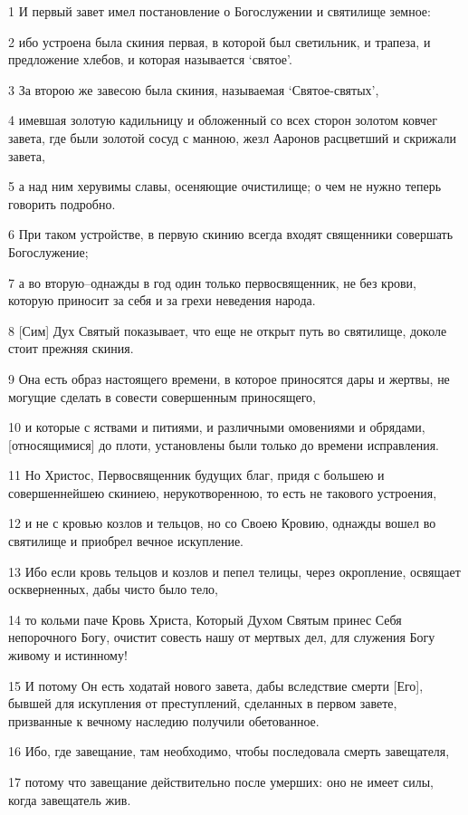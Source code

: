 \par 1 И первый завет имел постановление о Богослужении и святилище земное:
\par 2 ибо устроена была скиния первая, в которой был светильник, и трапеза, и предложение хлебов, и которая называется `святое'.
\par 3 За второю же завесою была скиния, называемая `Святое-святых',
\par 4 имевшая золотую кадильницу и обложенный со всех сторон золотом ковчег завета, где были золотой сосуд с манною, жезл Ааронов расцветший и скрижали завета,
\par 5 а над ним херувимы славы, осеняющие очистилище; о чем не нужно теперь говорить подробно.
\par 6 При таком устройстве, в первую скинию всегда входят священники совершать Богослужение;
\par 7 а во вторую--однажды в год один только первосвященник, не без крови, которую приносит за себя и за грехи неведения народа.
\par 8 [Сим] Дух Святый показывает, что еще не открыт путь во святилище, доколе стоит прежняя скиния.
\par 9 Она есть образ настоящего времени, в которое приносятся дары и жертвы, не могущие сделать в совести совершенным приносящего,
\par 10 и которые с яствами и питиями, и различными омовениями и обрядами, [относящимися] до плоти, установлены были только до времени исправления.
\par 11 Но Христос, Первосвященник будущих благ, придя с большею и совершеннейшею скиниею, нерукотворенною, то есть не такового устроения,
\par 12 и не с кровью козлов и тельцов, но со Своею Кровию, однажды вошел во святилище и приобрел вечное искупление.
\par 13 Ибо если кровь тельцов и козлов и пепел телицы, через окропление, освящает оскверненных, дабы чисто было тело,
\par 14 то кольми паче Кровь Христа, Который Духом Святым принес Себя непорочного Богу, очистит совесть нашу от мертвых дел, для служения Богу живому и истинному!
\par 15 И потому Он есть ходатай нового завета, дабы вследствие смерти [Его], бывшей для искупления от преступлений, сделанных в первом завете, призванные к вечному наследию получили обетованное.
\par 16 Ибо, где завещание, там необходимо, чтобы последовала смерть завещателя,
\par 17 потому что завещание действительно после умерших: оно не имеет силы, когда завещатель жив.
